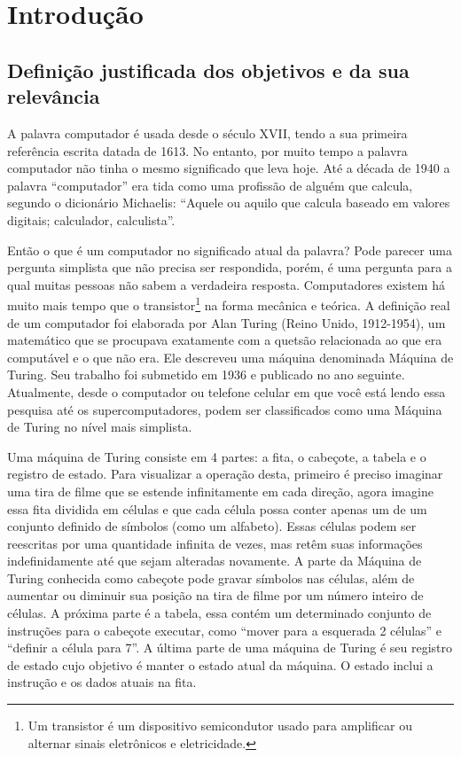 \section{Introdução} 
\subsection{Definição justificada dos objetivos e da sua relevância}
A palavra computador é usada desde o século XVII, tendo a sua primeira referência escrita datada de 1613. No entanto, por muito tempo a palavra computador não tinha o mesmo significado que leva hoje. Até a década de 1940 a palavra “computador” era tida como uma profissão de alguém que calcula, segundo o dicionário Michaelis: “Aquele ou aquilo que calcula baseado em valores digitais; calculador, calculista”.\cite{4}

Então o que é um computador no significado atual da palavra? Pode parecer uma pergunta simplista que não precisa ser respondida, porém, é uma pergunta para a qual muitas pessoas não sabem a verdadeira resposta. Computadores existem há muito mais tempo que o transistor\footnote{Um transistor é um dispositivo semicondutor usado para amplificar ou alternar sinais eletrônicos e eletricidade.} na forma mecânica e teórica. A definição real de um computador foi elaborada por Alan Turing (Reino Unido, 1912-1954), um matemático que se procupava exatamente com a quetsão relacionada ao que era computável e o que não era. Ele descreveu uma máquina denominada Máquina de Turing. Seu trabalho foi submetido em 1936 e publicado no ano seguinte. Atualmente, desde o computador ou telefone celular em que você está lendo essa pesquisa até os supercomputadores, podem ser classificados como uma Máquina de Turing no nível mais simplista.

Uma máquina de Turing consiste em 4 partes: a fita, o cabeçote, a tabela e o registro de estado. Para visualizar a operação desta, primeiro é preciso imaginar uma tira de filme que se estende infinitamente em cada direção, agora imagine essa fita dividida em células e que cada célula possa conter apenas um de um conjunto definido de símbolos (como um alfabeto). Essas células podem ser reescritas por uma quantidade infinita de vezes, mas retêm suas informações indefinidamente até que sejam alteradas novamente. A parte da Máquina de Turing conhecida como cabeçote pode gravar símbolos nas células, além de aumentar ou diminuir sua posição na tira de filme por um número inteiro de células. A próxima parte é a tabela, essa contém um determinado conjunto de instruções para o cabeçote executar, como “mover para a esquerada 2 células” e “definir a célula para 7”. A última parte de uma máquina de Turing é seu registro de estado cujo objetivo é manter o estado atual da máquina. O estado inclui a instrução e os dados atuais na fita.\cite{2}

